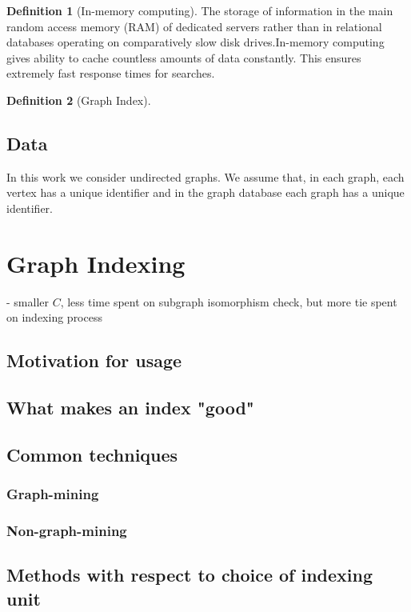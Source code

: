 \documentclass{l4proj}
\theoremstyle{definition}
\newtheorem{myDef}{Definition}
\begin{document}
        \begin{myDef}[In-memory computing]
        The storage of information in the main random access memory (RAM) of dedicated servers rather than in relational databases operating on comparatively slow disk drives.In-memory computing gives ability to cache countless amounts of data constantly. This ensures extremely fast response times for searches.
        \end{myDef}
        
        \begin{myDef} [Graph Index]
		
		\end{myDef}
           
    \section{Data}
    In this work we consider undirected graphs. We assume that, in each graph, each vertex has a unique identifier and in the graph database each graph has a unique identifier. 

        
\chapter{Graph Indexing}
- smaller $C$, less time spent on subgraph isomorphism check, but more tie spent on indexing process

	\section{Motivation for usage}
    \section{What makes an index "good"}
	\section{Common techniques}
    	\subsection{Graph-mining}
    	\subsection{Non-graph-mining}
        \label{subsec:non-data-mining}
    \section{Methods with respect to choice of indexing unit}
\end{document}
